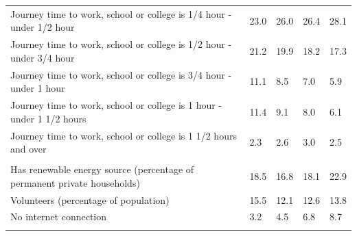\documentclass{article}
\begin{document}
\begin{table}[h]
\begin{tabular}{KTTTT}
Journey time to work, school or college is 1/4 hour - under 1/2 hour & 23.0& 26.0& 26.4& 28.1\\
Journey time to work, school or college is 1/2 hour - under 3/4 hour & 21.2& 19.9& 18.2& 17.3\\
Journey time to work, school or college is 3/4 hour - under 1 hour & 11.1&  8.5&  7.0&  5.9\\
Journey time to work, school or college is 1 hour - under 1 1/2 hours & 11.4&  9.1&  8.0&  6.1\\
Journey time to work, school or college is 1 1/2 hours and over & 2.3& 2.6& 3.0& 2.5\\
\hline
    \\ 
    \hline
Has renewable energy source (percentage of permanent private households) & 18.5& 16.8& 18.1& 22.9\\
    \hline
Volunteers (percentage of population) & 15.5& 12.1& 12.6& 13.8\\
    \hline
No internet connection& 3.2& 4.5& 6.8& 8.7\\
\hline
\end{tabular}
\end{table}
\end{document}
